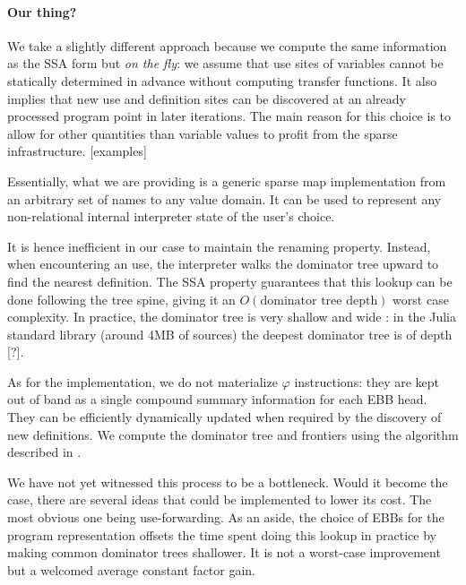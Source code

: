\documentclass[11pt]{article}
\renewcommand{\phi}{\varphi}
\begin{document}
\paragraph{Our thing?} We take a slightly different approach because we compute the same information as the SSA form but \emph{on the fly}: we assume that use sites of variables cannot be statically determined in advance without computing transfer functions.
It also implies that new use and definition sites can be discovered at an already processed program point in later iterations.
The main reason for this choice is to allow for other quantities than variable values to profit from the sparse infrastructure.
[examples]

Essentially, what we are providing is a generic sparse map implementation from an arbitrary set of names to any value domain.
It can be used to represent any non-relational internal interpreter state of the user's choice.

It is hence inefficient in our case to maintain the renaming property. Instead, when encountering an use, the interpreter walks the dominator tree upward to find the nearest definition.
The SSA property guarantees that this lookup can be done following the tree spine, giving it an $O(\text{dominator tree depth})$ worst case complexity. In practice, the dominator tree is very shallow and wide : in the Julia standard library (around 4MB of sources) the deepest dominator tree is of depth [?].

As for the implementation, we do not materialize $\phi$ instructions: they are kept out of band as a single compound summary information for each EBB head.
They can be efficiently dynamically updated when required by the discovery of new definitions.
We compute the dominator tree and frontiers using the algorithm described in \cite{domtree}.

We have not yet witnessed this process to be a bottleneck. Would it become the case, there are several ideas that could be implemented to lower its cost. The most obvious one being use-forwarding.
As an aside, the choice of EBBs for the program representation offsets the time spent doing this lookup in practice by making common dominator trees shallower.
It is not a worst-case improvement but a welcomed average constant factor gain.

\end{document}
